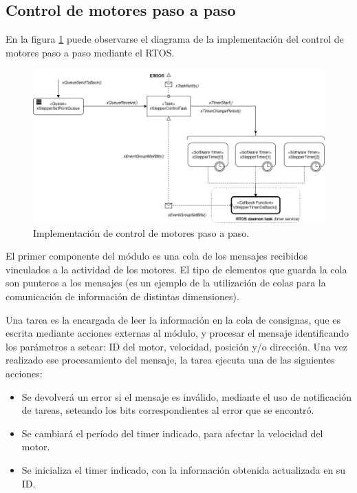 \documentclass{IEEEtran}
\begin{document}
\subsection{Control de motores paso a paso}
\label{sec:stepper}

En la figura \ref{fig:diagrama-stepper} puede observarse el diagrama de la implementación del control de motores paso a paso mediante el RTOS.

\begin{figure}[ht]
    \centering
    \includegraphics[scale=0.5]{../diagrama_stepper.png}
    \caption{Implementación de control de motores paso a paso.}
    \label{fig:diagrama-stepper}
\end{figure}

El primer componente del módulo es una cola de los mensajes recibidos vinculados a la actividad de los motores. El tipo de elementos que guarda la cola son punteros a los mensajes (es un ejemplo de la utilización de colas para la comunicación de información de distintas dimensiones).

Una tarea es la encargada de leer la información en la cola de consignas, que es escrita mediante acciones externas al módulo, y procesar el mensaje identificando los parámetros a setear: ID del motor, velocidad, posición y/o dirección. Una vez realizado ese procesamiento del mensaje, la tarea ejecuta una de las siguientes acciones:

\begin{itemize}
    \item Se devolverá un error si el mensaje es inválido, mediante el uso de notificación de tareas, seteando los bits correspondientes al error que se encontró.
    \item Se cambiará el período del timer indicado, para afectar la velocidad del motor.
    \item Se inicializa el timer indicado, con la información obtenida actualizada en su ID.
\end{itemize}
\end{document}
